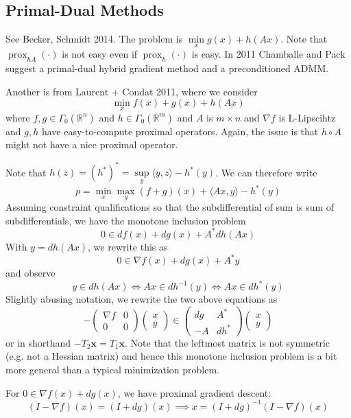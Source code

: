 \documentclass[english, 11pt]{article}
\DeclareMathOperator*{\prox}{prox}
\begin{document}
\subsection{Primal-Dual Methods}
See Becker, Schmidt 2014. The problem is $\min \limits_x g(x) + h(Ax)$. Note that $\prox_{hA}(\cdot)$ is not easy even if $\prox_h(\cdot)$ is easy. In 2011 Chamballe and Pack suggest a primal-dual hybrid gradient method and a preconditioned ADMM.

Another is from Laurent + Condat 2011, where we consider 
\[
\min \limits_x f(x) + g(x) + h(Ax)
\]
 where $f,g \in \Gamma_0(\mathbb{R}^n)$ and $h \in \Gamma_0(\mathbb{R}^m)$ and $A$ is $m \times n$ and $\nabla f$ is L-Lipscihtz and $g,h$ have easy-to-compute proximal operators. Again, the issue is that $h \circ A$ might not have a nice proximal operator. 

Note that $h(z) = (h^* )^* = \sup \limits_y \langle y,z \rangle - h^*(y)$. We can therefore write
\[
p = \min \limits_x \max \limits_y (f+g)(x) + \langle Ax,y \rangle - h^*(y)
\]
Assuming constraint qualifications so that the subdifferential of sum is sum of subdifferentials, we have the monotone inclusion problem
\[
0 \in d f(x) + d g(x) + A^* dh (Ax)
\]
 With $y = dh (Ax)$, we rewrite this as
 \[
 0 \in \nabla f(x) + dg(x) + A^* y
 \]
 and observe
 \[
 y \in dh(Ax) \iff Ax \in dh^{-1}(y) \iff Ax \in dh^*(y)
 \]
 Slightly abusing notation, we rewrite the two above equations as
 \[
 - \begin{pmatrix} \nabla f & 0 \\ 0 & 0 \end{pmatrix} \begin{pmatrix} x \\ y \end{pmatrix}
 \in \begin{pmatrix} dg & A^* \\ -A & dh^* \end{pmatrix} \begin{pmatrix} x \\ y \end{pmatrix}
 \]
 or in shorthand $ -T_2 \mathbf{x} = T_1 \mathbf{x}$. Note that the leftmost matrix is not symmetric (e.g. not a Hessian matrix) and hence this monotone inclusion problem is a bit more general than a typical minimization problem.
 
 For $0 \in \nabla f(x) + dg(x)$, we have proximal gradient descent:
 \[
 (I - \nabla f)(x) = (I + dg)(x) \implies x = (I + dg)^{-1} (I - \nabla f)(x)
 \]
 
\end{document}
